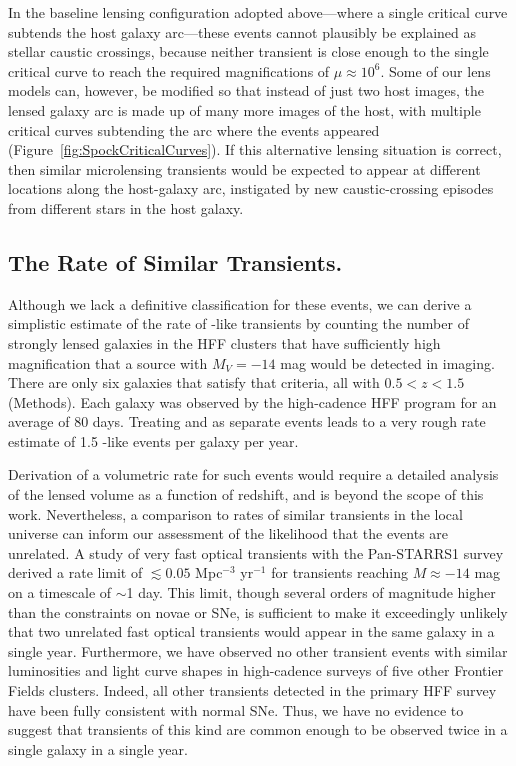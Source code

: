 In the baseline lensing configuration adopted above---where a single
critical curve subtends the \spock host galaxy arc---these events
cannot plausibly be explained as stellar caustic crossings, because
neither transient is close enough to the single critical curve to
reach the required magnifications of $\mu\approx10^6$.  Some of our lens
models can, however, be modified so that instead of just two host
images, the lensed galaxy arc is made up of many more images of the
host, with multiple critical curves subtending the arc where the
\spock events appeared (Figure~\ref{fig:SpockCriticalCurves}).
If this alternative lensing
situation is correct, then similar microlensing transients would be
expected to appear at different locations along the host-galaxy arc,
instigated by new caustic-crossing episodes from different stars in
the host galaxy.

\subsection{The Rate of Similar Transients.}\label{sec:Rates}

Although we lack a definitive classification for these events, we can
derive a simplistic estimate of the rate of \spock-like transients by
counting the number of strongly lensed galaxies in the HFF clusters
that have sufficiently high magnification that a source with
$M_{V}=-14$ mag would be detected in \HST imaging. There are only six
galaxies that satisfy that criteria, all with $0.5<z<1.5$
(Methods).  Each galaxy was observed by the high-cadence HFF program
for an average of 80 days.  Treating \spockone and \spocktwo as
separate events leads to a very rough rate estimate of 1.5 \spock-like
events per galaxy per year.

Derivation of a volumetric rate for such events would require a
detailed analysis of the lensed volume as a function of redshift, and
is beyond the scope of this work. Nevertheless, a comparison to rates
of similar transients in the local universe can inform our assessment
of the likelihood that the \spock events are unrelated.  A study of
very fast optical transients with the Pan-STARRS1 survey derived a
rate limit of $\lesssim0.05$ Mpc$^{-3}$ yr$^{-1}$ for transients
reaching $M\approx -14$ mag on a timescale of $\sim$1
day\citet{Berger:2013b}.  This limit, though several orders of
magnitude higher than the constraints on novae or SNe, is sufficient
to make it exceedingly unlikely that two unrelated fast optical
transients would appear in the same galaxy in a single year.
Furthermore, we have observed no other transient events with similar
luminosities and light curve shapes in high-cadence surveys of five
other Frontier Fields clusters. Indeed, all other transients detected
in the primary HFF survey have been fully consistent with normal SNe.
Thus, we have no evidence to suggest that transients of this kind are
common enough to be observed twice in a single galaxy in a single
year.
